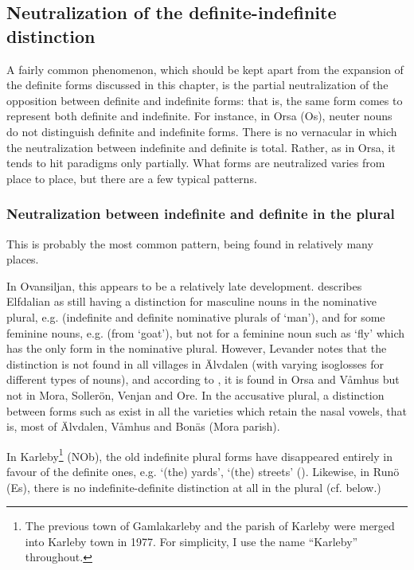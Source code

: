 \subsection{ Neutralization of the definite-indefinite distinction}
\label{sec:3.1.5}

A fairly common phenomenon, which should be kept apart from the expansion of the definite forms discussed in this chapter, is the partial neutralization of the opposition between definite and indefinite forms: that is, the same form comes to represent both definite and indefinite. For instance, in Orsa (Os), neuter nouns do not distinguish definite and indefinite forms. There is no vernacular in which the neutralization between indefinite and definite is total. Rather, as in Orsa, it tends to hit paradigms only partially. What forms are neutralized varies from place to place, but there are a few typical patterns.

\subsubsection{Neutralization between indefinite and definite in the plural}
 This is probably the most common pattern, being found in relatively many places. 

In Ovansiljan, this appears to be a relatively late development. \citet{Levander1909} describes Elfdalian as still having a distinction for masculine nouns in the nominative plural, e.g. (indefinite and definite nominative plurals of ‘man’), and for some feminine nouns, e.g.  (from  ‘goat’), but not for a feminine noun such as ‘fly’ which has the only form  in the nominative plural. However, Levander notes that the distinction is not found in all villages in Älvdalen (with varying isoglosses for different types of nouns), and according to \citet[170]{Levander1928}, it is found in Orsa and Våmhus but not in Mora, Sollerön, Venjan and Ore. In the accusative plural, a distinction between forms such as exist in all the varieties which retain the nasal vowels, that is, most of Älvdalen, Våmhus and Bonäs (Mora parish). 

In Karleby\footnote{ The previous town of Gamlakarleby and the parish of Karleby were merged into Karleby town in 1977. For simplicity, I use the name “Karleby” throughout. } (NOb), the old indefinite plural forms have disappeared entirely in favour of the definite ones, e.g.  ‘(the) yards’,  ‘(the) streets’ (\citet[93]{Hagfors1891}). Likewise, in Runö (Es), there is no indefinite-definite distinction at all in the plural (cf.  below.)

